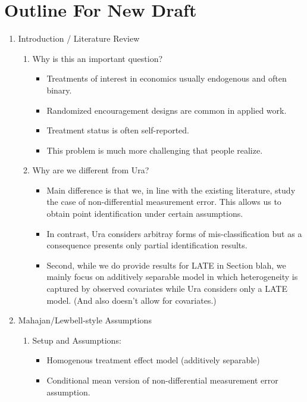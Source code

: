\documentclass[12pt]{article}
\begin{document}
\section{Outline For New Draft}
\begin{enumerate}
  \item Introduction / Literature Review
    \begin{enumerate}
      \item Why is this an important question?
        \begin{itemize}
          \item Treatments of interest in economics usually endogenous and often binary.
          \item Randomized encouragement designs are common in applied work.
          \item Treatment status is often self-reported.
          \item This problem is much more challenging that people realize.
        \end{itemize}
      \item Why are we different from Ura?
        \begin{itemize}
          \item Main difference is that we, in line with the existing literature, study the case of non-differential measurement error. This allows us to obtain point identification under certain assumptions.
          \item In contrast, Ura considers arbitray forms of mis-classification but as a consequence presents only partial identification results.
          \item Second, while we do provide results for LATE in Section blah, we mainly focus on additively separable model in which heterogeneity is captured by observed covariates while Ura considers only a LATE model. (And also doesn't allow for covariates.) 
        \end{itemize}
    \end{enumerate}
  \item Mahajan/Lewbell-style Assumptions 
    \begin{enumerate}
      \item Setup and Assumptions:
        \begin{itemize}
          \item Homogenous treatment effect model (additively separable)
          \item Conditional mean version of non-differential measurement error assumption.

\end{itemize}
\end{enumerate}
\end{enumerate}
\end{document}

